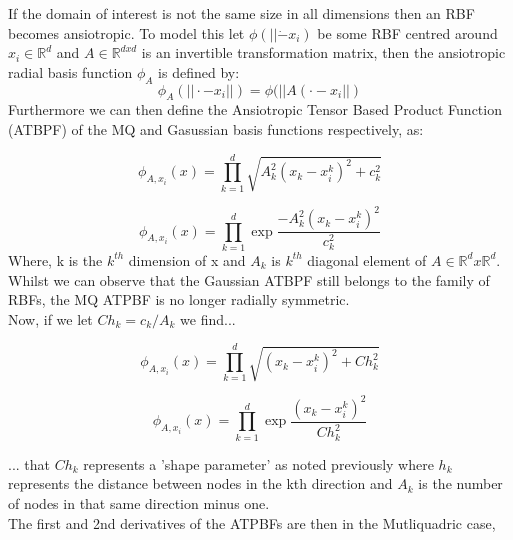 \documentclass[a4paper]{amsart}
\begin{document}
If the domain of interest is not the same size in all dimensions then an RBF becomes ansiotropic. To model this let $\phi(||\dot -x_{i})$ be some RBF centred around $x_{i} \in \mathbb{R}^{d}$ and $A \in \mathbb{R}^{d x d}$ is an invertible transformation matrix, then the ansiotropic radial basis function $\phi_{A}$ is defined by:
\begin{equation}
\phi_{A}(||\cdot-x_{i}||)=\phi(||A(\cdot-x_{i}||)
\end{equation}
Furthermore we can then define the Ansiotropic Tensor Based Product Function (ATBPF) of the MQ and Gasussian basis functions respectively, as:

\begin{equation}
\phi_{A,x_{i}}(x)= \prod^{d}_{k=1}\sqrt{A^{2}_{k}(x_{k}-x^{k}_{i})^{2}+c^{2}_k}
\end{equation}

\begin{equation}
\phi_{A,x_{i}}(x)= \prod^{d}_{k=1}\exp{\frac{-A^{2}_{k}(x_{k}-x^{k}_{i})^{2}}{ c^{2}_k}}
\end{equation}
Where, k is the $k^{th}$ dimension of x and $A_{k}$ is $k^{th}$ diagonal element of $A \in \mathbb{R}^{d} x \mathbb{R}^{d}$.\\

Whilst we can observe that the Gaussian ATBPF still belongs to the family of RBFs, the MQ ATPBF is no longer radially symmetric.\\

Now, if we let $Ch_{k} = c_{k} / A_{k}$ we find...

\begin{equation}
\phi_{A,x_{i}}(x)= \prod^{d}_{k=1}\sqrt{(x_{k}-x^{k}_{i})^{2}+Ch^{2}_k}
\end{equation}

\begin{equation}
\phi_{A,x_{i}}(x)= \prod^{d}_{k=1}\exp{\frac{(x_{k}-x^{k}_{i})^{2}}{ Ch^{2}_k}}
\end{equation}

... that $Ch_{k}$ represents a 'shape parameter' as noted previously where $h_{k}$ represents the distance between nodes in the kth direction and $A_{k}$ is the number of nodes in that same direction minus one.\\

The first and 2nd derivatives of the ATPBFs are then in the Mutliquadric case,
\end{document}
